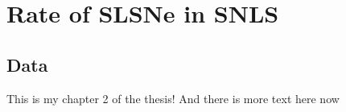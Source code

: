 
\chapter{Rate of SLSNe in SNLS} %
\label{Chapter2}


\section{Data}
This is my chapter 2 of the thesis!
And there is more text here now
